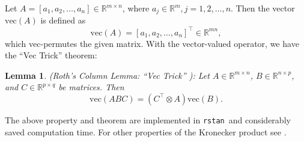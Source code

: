 \documentclass[a4paper]{article}   	%
\newtheorem{lemma}[theorem]{Lemma}
\newcommand{\rstan}{\texttt{rstan}}
\begin{document}
	
	
	Let $A=[a_1,a_2,\ldots,a_n]\in \mathbb{R}^{m\times n}$, where $a_j\in\mathbb{R}^m, j=1,2,\ldots,n$. Then the vector $\mbox{vec}(A)$ is defined as 
	\begin{equation}
		\mbox{vec}(A) = [a_1,a_2,\ldots,a_n]^\top \in \mathbb{R}^{mn}, 
	\end{equation}
	which vec-permutes the given matrix. With the vector-valued operator, we have the ``Vec Trick'' theorem: 	
	\begin{lemma} (Roth's Column Lemma: ``Vec Trick'' \parencite{Roth1934Direct, Airola2018Fast} ): Let $A \in \mathbb{R}^{m\times n}$, $B \in \mathbb{R}^{n\times p}$, and $C \in \mathbb{R}^{p\times q}$ be matrices. Then
			\begin{equation}
			 \mbox{vec}(ABC) =	(C^\top \otimes A)\mbox{vec}(B). 
			\end{equation}
	\end{lemma}
	
	The above property and theorem are implemented in \rstan\ and considerably saved computation time. For other properties of the Kronecker product see \textcite{Zhang2013Kronecker}.
	
	
	\renewcommand\bibname{References}%
	\printbibliography
\end{document}
